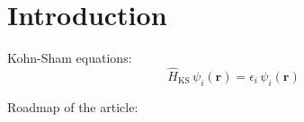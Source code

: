 \section{Introduction}

Kohn-Sham equations:
\begin{equation}
\hat{H}_{\mathrm{KS}}\,\psi_{i}(\mathbf{r}) = \epsilon_{i}\,\psi_{i}(\mathbf{r})
\end{equation}

Roadmap of the article: